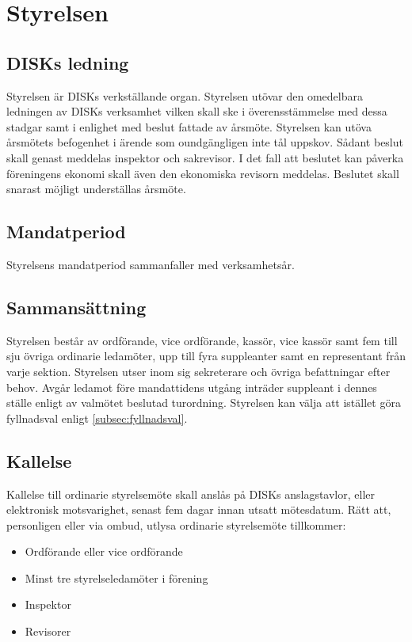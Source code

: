 \clearpage
\section{Styrelsen}
\label{sec:styrelsen}

        \subsection{DISKs ledning}
        \label{subsec:disksledning}
                Styrelsen är DISKs verkställande organ. Styrelsen utövar den omedelbara ledningen av DISKs verksamhet vilken skall ske i överensstämmelse med dessa stadgar samt i enlighet med beslut fattade av årsmöte. Styrelsen kan utöva årsmötets befogenhet i ärende som oundgängligen inte tål uppskov. Sådant beslut skall genast meddelas inspektor och sakrevisor. I det fall att beslutet kan påverka föreningens ekonomi skall även den ekonomiska revisorn meddelas. Beslutet skall snarast möjligt underställas årsmöte.

        \subsection{Mandatperiod}
        \label{subsec:mandatperiod}
                Styrelsens mandatperiod sammanfaller med verksamhetsår.

        \subsection{Sammansättning}
        \label{subsec:sammansattning}
                Styrelsen består av ordförande, vice ordförande, kassör, vice kassör samt fem till sju övriga ordinarie ledamöter, upp till fyra suppleanter samt en representant från varje sektion. Styrelsen utser inom sig sekreterare och övriga befattningar efter behov. Avgår ledamot före mandattidens utgång inträder suppleant i dennes ställe enligt av valmötet beslutad turordning. Styrelsen kan välja att istället göra fyllnadsval enligt \ref{subsec:fyllnadsval}.

        \subsection{Kallelse}
        \label{subsec:kallelse}
                Kallelse till ordinarie styrelsemöte skall anslås på DISKs anslagstavlor, eller elektronisk motsvarighet, senast fem dagar innan utsatt mötesdatum. Rätt att, personligen eller via ombud, utlysa ordinarie styrelsemöte tillkommer:
                \begin{itemize}
                \setlength{\itemsep}{0.0cm}
                \setlength{\parskip}{0.0cm}
                        \item Ordförande eller vice ordförande
                        \item Minst tre styrelseledamöter i förening
                        \item Inspektor
                        \item Revisorer
                \end{itemize}

